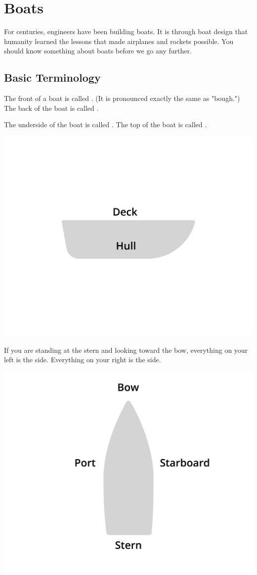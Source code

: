 \chapter{Boats}

For centuries,  engineers have been building boats.  It is through boat design that humanity learned the lessons that made airplanes and rockets possible.  
You should know something about boats before we go any further.

\section{Basic Terminology}

The front of a boat is called . (It is pronounced exactly the same as "bough.")   The back of the boat is called .

The underside of the boat is called .  The top of the boat is called .

\includegraphics[width=.75\textwidth]{deckHull.png}


If you are standing at the stern and looking toward the bow,  everything on your left is the  side.  Everything on your right is the  side.

\includegraphics[width=.75\textwidth]{bowStern.png}

